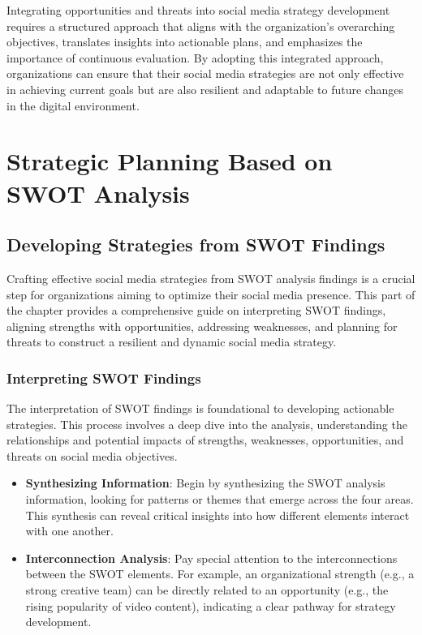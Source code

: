 \documentclass[
]{book}
\providecommand{\tightlist}{%
  \setlength{\itemsep}{0pt}\setlength{\parskip}{0pt}}
\begin{document}
Integrating opportunities and threats into social media strategy development requires a structured approach that aligns with the organization's overarching objectives, translates insights into actionable plans, and emphasizes the importance of continuous evaluation. By adopting this integrated approach, organizations can ensure that their social media strategies are not only effective in achieving current goals but are also resilient and adaptable to future changes in the digital environment.

\hypertarget{strategic-planning-based-on-swot-analysis}{%
\section*{Strategic Planning Based on SWOT Analysis}\label{strategic-planning-based-on-swot-analysis}}

\hypertarget{developing-strategies-from-swot-findings}{%
\subsection{Developing Strategies from SWOT Findings}\label{developing-strategies-from-swot-findings}}

Crafting effective social media strategies from SWOT analysis findings is a crucial step for organizations aiming to optimize their social media presence. This part of the chapter provides a comprehensive guide on interpreting SWOT findings, aligning strengths with opportunities, addressing weaknesses, and planning for threats to construct a resilient and dynamic social media strategy.

\hypertarget{interpreting-swot-findings}{%
\subsubsection{Interpreting SWOT Findings}\label{interpreting-swot-findings}}

The interpretation of SWOT findings is foundational to developing actionable strategies. This process involves a deep dive into the analysis, understanding the relationships and potential impacts of strengths, weaknesses, opportunities, and threats on social media objectives.

\begin{itemize}
\tightlist
\item
  \textbf{Synthesizing Information}: Begin by synthesizing the SWOT analysis information, looking for patterns or themes that emerge across the four areas. This synthesis can reveal critical insights into how different elements interact with one another.
\item
  \textbf{Interconnection Analysis}: Pay special attention to the interconnections between the SWOT elements. For example, an organizational strength (e.g., a strong creative team) can be directly related to an opportunity (e.g., the rising popularity of video content), indicating a clear pathway for strategy development.
\end{itemize}
\end{document}
